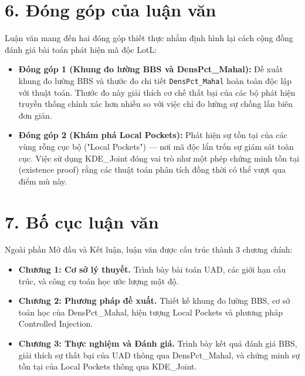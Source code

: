 \documentclass[../main.tex]{subfiles}
\begin{document}
\section*{6. Đóng góp của luận văn}

Luận văn mang đến hai đóng góp thiết thực nhằm định hình lại cách cộng đồng đánh giá bài toán phát hiện mã độc LotL:
\begin{itemize}
    \item \textbf{Đóng góp 1 (Khung đo lường BBS và DensPct\_Mahal):} Đề xuất khung đo lường BBS và thước đo chi tiết \texttt{DensPct\_Mahal} hoàn toàn độc lập với thuật toán. Thước đo này giải thích cơ chế thất bại của các bộ phát hiện truyền thống chính xác hơn nhiều so với việc chỉ đo lường sự chồng lấn biên đơn giản.
    \item \textbf{Đóng góp 2 (Khám phá Local Pockets):} Phát hiện sự tồn tại của các vùng rỗng cục bộ ("Local Pockets") — nơi mã độc lẩn trốn sự giám sát toàn cục. Việc sử dụng KDE\_Joint đóng vai trò như một phép chứng minh tồn tại (existence proof) rằng các thuật toán phân tích đồng thời có thể vượt qua điểm mù này.
\end{itemize}

\section*{7. Bố cục luận văn}

Ngoài phần Mở đầu và Kết luận, luận văn được cấu trúc thành 3 chương chính:
\begin{itemize}
    \item \textbf{Chương 1: Cơ sở lý thuyết.} Trình bày bài toán UAD, các giới hạn cấu trúc, và công cụ toán học ước lượng mật độ.
    \item \textbf{Chương 2: Phương pháp đề xuất.} Thiết kế khung đo lường BBS, cơ sở toán học của DensPct\_Mahal, hiện tượng Local Pockets và phương pháp Controlled Injection.
    \item \textbf{Chương 3: Thực nghiệm và Đánh giá.} Trình bày kết quả đánh giá BBS, giải thích sự thất bại của UAD thông qua DensPct\_Mahal, và chứng minh sự tồn tại của Local Pockets thông qua KDE\_Joint.
\end{itemize}
\end{document}
